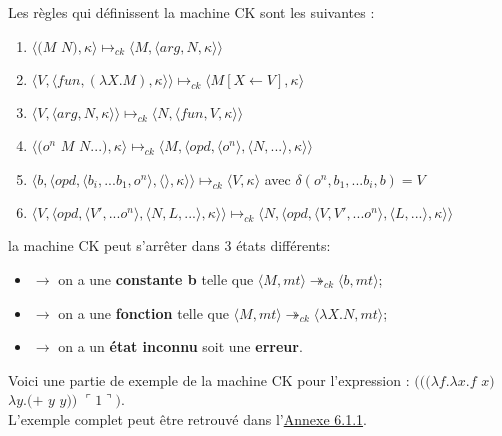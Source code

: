 \documentclass[10pt,a4paper]{article}
\begin{document}
				
				Les règles qui définissent la machine CK sont les suivantes :
				\begin{enumerate}
					\item $\langle(M$ $N),\kappa\rangle \longmapsto_{ck} \langle M,\langle arg,N,\kappa\rangle\rangle$
					\item $\langle V,\langle fun,(\lambda X.M),\kappa \rangle \rangle \longmapsto_{ck} \langle M[X \leftarrow V],\kappa\rangle$
					\item $\langle V,\langle arg,N,\kappa \rangle \rangle \longmapsto_{ck} \langle N,\langle fun,V,\kappa \rangle \rangle$
					\item $\langle(o^{n}$ $M$ $N...),\kappa\rangle \longmapsto_{ck} \langle M,\langle opd,\langle o^{n}\rangle,\langle N,...\rangle,\kappa\rangle\rangle$
					\item $\langle b,\langle opd,\langle b_{i},...b_{1},o^{n}\rangle,\langle\rangle,\kappa\rangle\rangle \longmapsto_{ck} \langle V,\kappa\rangle$ avec $\delta(o^{n},b_{1},...b_{i},b) = V$
					\item $\langle V,\langle opd,\langle V',...o^{n}\rangle,\langle N,L,...\rangle,\kappa\rangle\rangle \longmapsto_{ck} \langle N,\langle opd,\langle V,V',...o^{n}\rangle,\langle L,...\rangle,\kappa\rangle\rangle$
				\end{enumerate}
				\bigbreak
				
				
				la machine CK peut s'arrêter dans 3 états différents:
				\begin{itemize}
					\item[]$\longrightarrow$ on a une \textbf{constante b} telle que $\langle M,mt\rangle \twoheadrightarrow_{ck} \langle b,mt\rangle$;
					\item[]$\longrightarrow$ on a une \textbf{fonction} telle que $\langle M,mt\rangle \twoheadrightarrow_{ck} \langle\lambda X.N,mt\rangle$;
					\item[]$\longrightarrow$ on a un \textbf{état inconnu} soit une \textbf{erreur}.
				\end{itemize}
				\bigbreak
			
			
				Voici une partie de exemple de la machine CK pour l'expression : 
				$(((\lambda f.\lambda x.f$ $x)$ $\lambda y.(+$ $y$ $y))$ $\ulcorner 1\urcorner)$.
				\\ L'exemple complet peut être retrouvé dans l'\hyperref[CK]{Annexe 6.1.1}.
				
\end{document}
